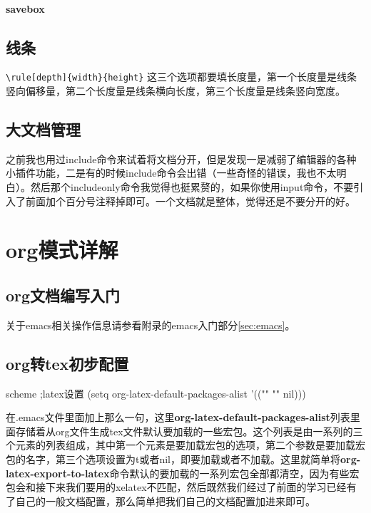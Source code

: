\documentclass[11pt,oneside]{book}
\begin{document}
\subsection{savebox}


\chapter{线条}
\verb+\rule[depth]{width}{height}+
这三个选项都要填长度量，第一个长度量是线条竖向偏移量，第二个长度量是线条横向长度，第三个长度量是线条竖向宽度。

\chapter{大文档管理}
之前我也用过include命令来试着将文档分开，但是发现一是减弱了编辑器的各种小插件功能，二是有的时候include命令会出错（一些奇怪的错误，我也不太明白）。然后那个includeonly命令我觉得也挺累赘的，如果你使用input命令，不要引入了前面加个百分号注释掉即可。一个文档就是整体，觉得还是不要分开的好。



\part{org模式详解}
\chapter{org文档编写入门}
关于emacs相关操作信息请参看附录的emacs入门部分\ref{sec:emacs}。



\chapter{org转tex初步配置}
\begin{tcbcode}[]{scheme}
;latex设置
(setq org-latex-default-packages-alist  '(("" "" nil)))
\end{tcbcode}

在.emacs文件里面加上那么一句，这里\textbf{org-latex-default-packages-alist}列表里面存储着从org文件生成tex文件默认要加载的一些宏包。这个列表是由一系列的三个元素的列表组成，其中第一个元素是要加载宏包的选项，第二个参数是要加载宏包的名字，第三个选项设置为t或者nil，即要加载或者不加载。这里就简单将\textbf{org-latex-export-to-latex}命令默认的要加载的一系列宏包全部都清空，因为有些宏包会和接下来我们要用的xelatex不匹配，然后既然我们经过了前面的学习已经有了自己的一般文档配置，那么简单把我们自己的文档配置加进来即可。
\end{document}
